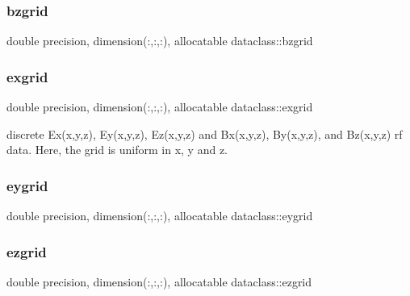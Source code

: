 \mbox{\label{group__name_gaabd84b55c65371356291620ee4dceb06}} 
\subsubsection{\texorpdfstring{bzgrid}{bzgrid}}
{\footnotesize\ttfamily double precision, dimension(\+:,\+:,\+:), allocatable dataclass\+::bzgrid}

\mbox{\label{group__name_ga3379b2d98107a6908aabb71e53031c00}} 
\subsubsection{\texorpdfstring{exgrid}{exgrid}}
{\footnotesize\ttfamily double precision, dimension(\+:,\+:,\+:), allocatable dataclass\+::exgrid}



discrete Ex(x,y,z), Ey(x,y,z), Ez(x,y,z) and Bx(x,y,z), By(x,y,z), and Bz(x,y,z) rf data. Here, the grid is uniform in x, y and z. 

\mbox{\label{group__name_ga85c21f161fb74970fc84639092c193dd}} 
\subsubsection{\texorpdfstring{eygrid}{eygrid}}
{\footnotesize\ttfamily double precision, dimension(\+:,\+:,\+:), allocatable dataclass\+::eygrid}

\mbox{\label{group__name_gaff9491f2e1258faccd2530eace979c78}} 
\subsubsection{\texorpdfstring{ezgrid}{ezgrid}}
{\footnotesize\ttfamily double precision, dimension(\+:,\+:,\+:), allocatable dataclass\+::ezgrid}

\mbox{\label{group__name_ga6302bc97206196f7003db67abd75507e}} 
